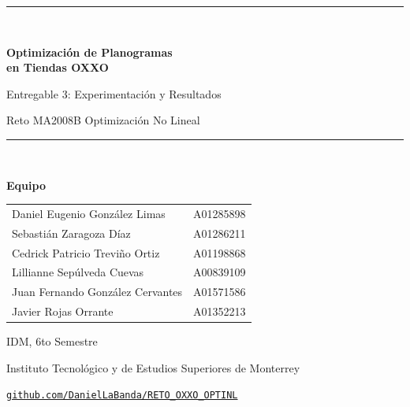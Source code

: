 \documentclass[11pt,letterpaper]{article}
\title{\vspace{-1.5em}}
\begin{document}
\begin{titlepage}
\centering
\vspace*{1.2cm}
{\color{oxxored}\rule{\linewidth}{2pt}}\\[0.5cm]
{\Huge\bfseries\color{oxxodark} Optimizaci\'on de Planogramas\\[0.25em]
en Tiendas OXXO\par}
\vspace{0.5cm}
{\Large Entregable 3: Experimentaci\'on y Resultados\par}
\vspace{0.2cm}
{\large Reto MA2008B\,\textendash\,Optimizaci\'on No Lineal\par}
{\color{oxxored}\rule{\linewidth}{2pt}}\\[1.4cm]

{\large\bfseries Equipo\par}
\vspace{0.4cm}
\begin{tabular}{ll}
Daniel Eugenio Gonz\'alez Limas    & A01285898 \\
Sebasti\'an Zaragoza D\'iaz        & A01286211 \\
Cedrick Patricio Trevi\~no Ortiz   & A01198868 \\
Lillianne Sep\'ulveda Cuevas       & A00839109 \\
Juan Fernando Gonz\'alez Cervantes & A01571586 \\
Javier Rojas Orrante               & A01352213 \\
\end{tabular}

\vfill
{\large IDM, 6to Semestre\par}
{\large Instituto Tecnol\'ogico y de Estudios Superiores de Monterrey\par}
\vspace{0.6cm}
\href{https://github.com/DanielLaBanda/RETO_OXXO_OPTINL}{\texttt{github.com/DanielLaBanda/RETO\_OXXO\_OPTINL}}
\vspace{1cm}
\end{titlepage}
\end{document}
